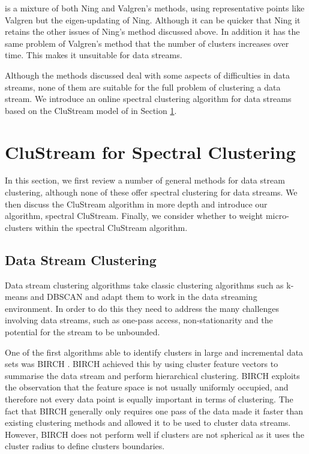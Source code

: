 \cite{Kong2011} is a mixture of both Ning and Valgren's methods, using representative points like Valgren but the eigen-updating of Ning. Although it can be quicker that Ning it retains the other issues of Ning's method discussed above. In addition it has the same problem of Valgren's method that the number of clusters increases over time. This makes it unsuitable for data streams. %


Although the methods discussed deal with some aspects of difficulties in data streams, none of them are suitable for the full problem of clustering a data stream. We introduce an online spectral clustering algorithm for data streams based on the CluStream model of \cite{Aggarwal2003} in Section \ref{sec:microSpec}.


\section{CluStream for Spectral Clustering}
\label{sec:microSpec}

In this section, we first review a number of general methods for data stream clustering, although none of these offer spectral clustering for data streams. We then discuss the CluStream algorithm in more depth and introduce our algorithm, spectral CluStream. Finally, we consider whether to weight micro-clusters within the spectral CluStream algorithm.

\subsection{Data Stream Clustering}

Data stream clustering algorithms take classic clustering algorithms such as k-means \citep{MacQueen1967} and DBSCAN \citep{Ester1996} and adapt them to work in the data streaming environment. In order to do this they need to address the many challenges involving data streams, such as one-pass access, non-stationarity and the potential for the stream to be unbounded.

One of the first algorithms able to identify clusters in large and incremental data sets was BIRCH \citep{Zhang1996a}. BIRCH achieved this by using cluster feature vectors to summarise the data stream and perform hierarchical clustering. BIRCH exploits the observation that the feature space is not usually uniformly occupied, and therefore not every data point is equally important in terms of clustering. The fact that BIRCH generally only requires one pass of the data made it faster than existing clustering methods and allowed it to be used to cluster data streams. However, BIRCH does not perform well if clusters are not spherical as it uses the cluster radius to define clusters boundaries.

